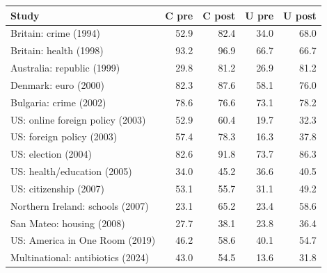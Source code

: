 \begin{tabular}{lrrrr}
\toprule
Study & C pre & C post & U pre & U post \\
\midrule
Britain: crime (1994) & 52.9 & 82.4 & 34.0 & 68.0 \\
Britain: health (1998) & 93.2 & 96.9 & 66.7 & 66.7 \\
Australia: republic (1999) & 29.8 & 81.2 & 26.9 & 81.2 \\
Denmark: euro (2000) & 82.3 & 87.6 & 58.1 & 76.0 \\
Bulgaria: crime (2002) & 78.6 & 76.6 & 73.1 & 78.2 \\
US: online foreign policy (2003) & 52.9 & 60.4 & 19.7 & 32.3 \\
US: foreign policy (2003) & 57.4 & 78.3 & 16.3 & 37.8 \\
US: election (2004) & 82.6 & 91.8 & 73.7 & 86.3 \\
US: health/education (2005) & 34.0 & 45.2 & 36.6 & 40.5 \\
US: citizenship (2007) & 53.1 & 55.7 & 31.1 & 49.2 \\
Northern Ireland: schools (2007) & 23.1 & 65.2 & 23.4 & 58.6 \\
San Mateo: housing (2008) & 27.7 & 38.1 & 23.8 & 36.4 \\
US: America in One Room (2019) & 46.2 & 58.6 & 40.1 & 54.7 \\
Multinational: antibiotics (2024) & 43.0 & 54.5 & 13.6 & 31.8 \\
\bottomrule
\end{tabular}

